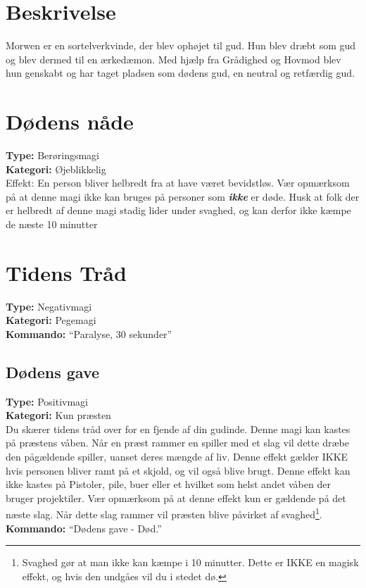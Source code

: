 \section{Beskrivelse}
Morwen er en sortelverkvinde, der blev ophøjet til gud. Hun blev dræbt som gud og blev dermed til en ærkedæmon. Med hjælp fra Grådighed og Hovmod blev hun genskabt og har taget pladsen som dødens gud, en neutral og retfærdig gud.\\

\section{Dødens nåde}
\textbf{Type:} Berøringsmagi\\
\textbf{Kategori:} Øjeblikkelig\\
Effekt: En person bliver helbredt fra at have været bevidstløs. Vær opmærksom på at denne magi ikke kan bruges på personer som \textbf{\textit{ikke}} er døde. Husk at folk der er helbredt af denne magi stadig lider under svaghed, og kan derfor ikke kæmpe de næste 10 minutter

\section{Tidens Tråd}
\textbf{Type:} Negativmagi\\
\textbf{Kategori:} Pegemagi\\
\textbf{Kommando:} “Paralyse, 30 sekunder”

\subsection{Dødens gave}
\textbf{Type:} Positivmagi\\
\textbf{Kategori:} Kun præsten\\
Du skærer tidens tråd over for en fjende af din gudinde. Denne magi kan kastes på præstens våben. Når en præst rammer en spiller med et slag vil dette dræbe den pågældende spiller, uanset deres mængde af liv.
Denne effekt gælder IKKE hvis personen bliver ramt på et skjold, og vil også blive brugt. Denne effekt kan ikke kastes på Pistoler, pile, buer eller et hvilket som helst andet våben der bruger projektiler. Vær opmærksom på at denne effekt kun er gældende på det næste slag. Når dette slag rammer vil præsten blive påvirket af svaghed\footnote{Svaghed gør at man ikke kan kæmpe i 10 minutter. Dette er IKKE en magisk effekt, og hvis den undgåes vil du i stedet dø.}.\\
\textbf{Kommando:} “Dødens gave - Død.”

